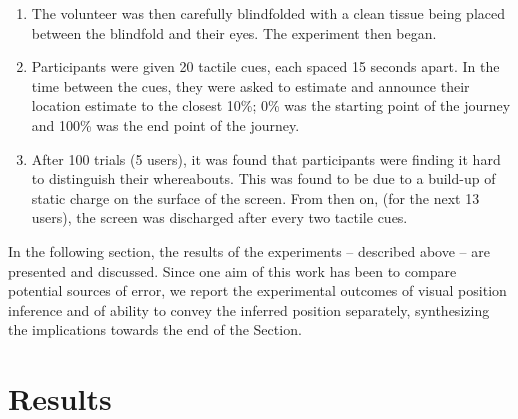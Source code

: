 \begin{enumerate}
\item The volunteer was then carefully blindfolded with a clean tissue being placed between the blindfold and their eyes. The experiment then began.

\item Participants were given 20 tactile cues, each spaced 15 seconds apart. In the time between the cues, they were asked to estimate and announce their location estimate to the closest 10\%; 0\% was the starting point of the journey and 100\% was the end point of the journey.

\item After 100 trials (5 users), it was found that participants were finding it hard to distinguish their whereabouts. This was found to be due to a build-up of static charge on the surface of the screen. From then on, (for the next 13 users), the screen was discharged after every two tactile cues.

\end{enumerate}
In the following section, the results of the experiments -- described above -- are presented and discussed. Since one aim of this work has been to compare potential sources of error, we report the experimental outcomes of visual position inference and of ability to convey the inferred position separately, synthesizing the implications towards the end of the Section.

\section{Results}
\label{sec:results}

